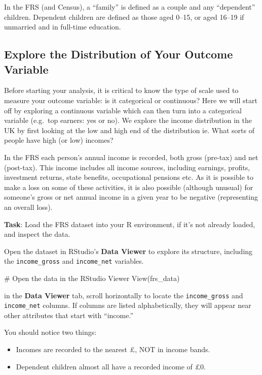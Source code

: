 \documentclass[
  letterpaper,
  DIV=11,
  numbers=noendperiod]{scrreprt}
\newenvironment{Shaded}{\begin{snugshade}}{\end{snugshade}}
\newcommand{\CommentTok}[1]{\textcolor[rgb]{0.37,0.37,0.37}{#1}}
\newcommand{\FunctionTok}[1]{\textcolor[rgb]{0.28,0.35,0.67}{#1}}
\newcommand{\NormalTok}[1]{\textcolor[rgb]{0.00,0.23,0.31}{#1}}
\providecommand{\tightlist}{%
  \setlength{\itemsep}{0pt}\setlength{\parskip}{0pt}}\usepackage{longtable,booktabs,array}
\begin{document}
In the FRS (and Census), a ``family'' is defined as a couple and any
``dependent'' children. Dependent children are defined as those aged
0--15, or aged 16--19 if unmarried and in full-time education.

\subsection{Explore the Distribution of Your Outcome
Variable}\label{explore-the-distribution-of-your-outcome-variable}

Before starting your analysis, it is critical to know the type of scale
used to measure your outcome variable: is it categorical or continuous?
Here we will start off by exploring a continuous variable which can then
turn into a categorical variable (e.g.~top earners: yes or no). We
explore the income distribution in the UK by first looking at the low
and high end of the distribution ie. What sorts of people have high (or
low) incomes?

In the FRS each person's annual income is recorded, both gross (pre-tax)
and net (post-tax). This income includes all income sources, including
earnings, profits, investment returns, state benefits, occupational
pensions etc. As it is possible to make a loss on some of these
activities, it is also possible (although unusual) for someone's gross
or net annual income in a given year to be negative (representing an
overall loss).

\textbf{Task}: Load the FRS dataset into your R environment, if it's not
already loaded, and inspect the data.

Open the dataset in RStudio's \textbf{Data Viewer} to explore its
structure, including the \texttt{income\_gross} and \texttt{income\_net}
variables.

\begin{Shaded}
\begin{Highlighting}[]
 \CommentTok{\# Open the data in the RStudio Viewer}
\FunctionTok{View}\NormalTok{(frs\_data)}
\end{Highlighting}
\end{Shaded}

in the \textbf{Data Viewer} tab, scroll horizontally to locate the
\texttt{income\_gross} and \texttt{income\_net} columns. If columns are
listed alphabetically, they will appear near other attributes that start
with ``income.''

You should notice two things:

\begin{itemize}
\tightlist
\item
  Incomes are recorded to the nearest £, NOT in income bands.
\item
  Dependent children almost all have a recorded income of £0.
\end{itemize}
\end{document}
